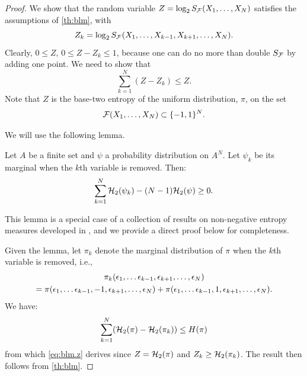 \begin{proof}
We show that the random variable $Z = \log_2 S_{\mathcal F}(X_1, \ldots, X_N)$ satisfies the assumptions of  \cref{th:blm}, with
\[
Z_k = \log_2 S_{\mathcal F}(X_1, \ldots,X_{k-1}, X_{k+1}, \ldots,  X_N).
\]
Clearly, $0\leq Z$, $0 \leq Z - Z_k \leq 1$, because one can do no more than double $S_{{\mathcal F}}$ by adding one point. We need to show that
\begin{equation}
\label{eq:blm.z}
\sum_{k=1}^N (Z-Z_k) \leq Z. 
\end{equation}
Note that $Z$ is the base-two entropy of the uniform distribution, $\pi$, on the set 
\[
{\mathcal F}(X_1, \ldots, X_N)\subset\{-1, 1\}^N.
\]

We will use the following lemma.
\begin{lemma}
Let $A$ be  a finite set and $\psi$ a probability distribution on $A^N$. Let $\psi_k$ be its marginal when the $k$th variable is removed. Then: 
\label{lem:han}
\begin{equation}
\label{eq:han}
\sum_{k=1}^N  {\mathcal H}_2(\psi_k) - (N-1) {\mathcal H}_2(\psi) \geq 0.
\end{equation}
\end{lemma}
This lemma is a special case of a collection of results on non-negative entropy measures developed in \citet{han1978nonnegative}, and we provide a direct proof below for completeness. 

 Given the lemma,  let $\pi_k$ denote the marginal distribution of $\pi$ when the $k$th variable is removed, i.e., 
\begin{multline*}
\pi_k(\epsilon_1, \ldots  \epsilon_{k-1}, \epsilon_{k+1}, \ldots, \epsilon_N)\\
 =  \pi(\epsilon_1, \ldots  \epsilon_{k-1}, -1, \epsilon_{k+1}, \ldots, \epsilon_N)  + \pi(\epsilon_1, \ldots  \epsilon_{k-1}, 1, \epsilon_{k+1}, \ldots, \epsilon_N).
\end{multline*}
We have:
\[
\sum_{k=1}^N ({\mathcal H}_2(\pi)- {\mathcal H}_2(\pi_k)) \leq H(\pi) 
\]
from which \cref{eq:blm.z} derives since $Z = {\mathcal H}_2(\pi)$ and $Z_k \geq {\mathcal H}_2(\pi_k)$. The result then follows from   \cref{th:blm}.


\end{proof}
